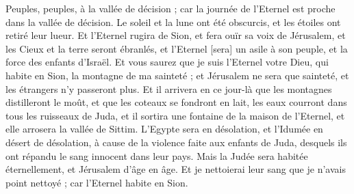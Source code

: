 \begin{multicols}{2}
Peuples, peuples, à la vallée de décision ; car la journée de l'Eternel est proche dans la vallée de décision.
Le soleil et la lune ont été obscurcis, et les étoiles ont retiré leur lueur.
Et l'Eternel rugira de Sion, et fera ouïr sa voix de Jérusalem, et les Cieux et la terre seront ébranlés, et l'Eternel [sera] un asile à son peuple, et la force des enfants d'Israël.
Et vous saurez que je suis l'Eternel votre Dieu, qui habite en Sion, la montagne de ma sainteté ; et Jérusalem ne sera que sainteté, et les étrangers n'y passeront plus.
Et il arrivera en ce jour-là que les montagnes distilleront le moût, et que les coteaux se fondront en lait, les eaux courront dans tous les ruisseaux de Juda, et il sortira une fontaine de la maison de l'Eternel, et elle arrosera la vallée de Sittim.
L'Egypte sera en désolation, et l'Idumée en désert de désolation, à cause de la violence faite aux enfants de Juda, desquels ils ont répandu le sang innocent dans leur pays.
Mais la Judée sera habitée éternellement, et Jérusalem d'âge en âge.
Et je nettoierai leur sang que je n'avais point nettoyé ; car l'Eternel habite en Sion.
\PPE{}
\end{multicols}
